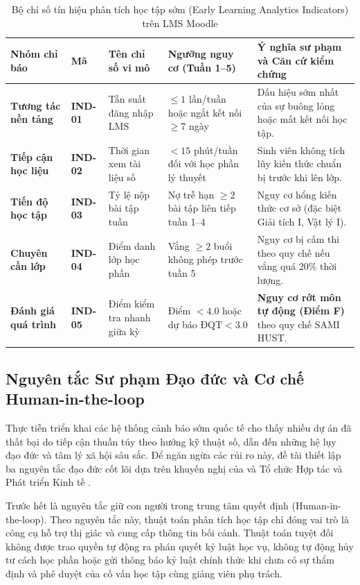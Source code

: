 \begin{table}[htbp]
\centering
\caption{Bộ chỉ số tín hiệu phân tích học tập sớm (Early Learning Analytics Indicators) trên LMS Moodle}
\label{tab:chi_so_la}
\vspace{0.2cm}
\begin{tabularx}{\textwidth}{|L{2.5cm}|C{1.5cm}|L{3.2cm}|C{2.0cm}|Y|}
\hline
\textbf{Nhóm chỉ báo} & \textbf{Mã} & \textbf{Tên chỉ số vi mô} & \textbf{Ngưỡng nguy cơ (Tuần 1--5)} & \textbf{Ý nghĩa sư phạm và Căn cứ kiểm chứng} \\
\hline
\textbf{Tương tác nền tảng} & \textbf{IND-01} & Tần suất đăng nhập LMS & $\le 1$ lần/tuần hoặc ngắt kết nối $\ge 7$ ngày & Dấu hiệu sớm nhất của sự buông lỏng hoặc mất kết nối học tập. \\
\hline
\textbf{Tiếp cận học liệu} & \textbf{IND-02} & Thời gian xem tài liệu số & $< 15$ phút/tuần đối với học phần lý thuyết & Sinh viên không tích lũy kiến thức chuẩn bị trước khi lên lớp. \\
\hline
\textbf{Tiến độ học tập} & \textbf{IND-03} & Tỷ lệ nộp bài tập tuần & Nợ trễ hạn $\ge 2$ bài tập liên tiếp tuần 1--4 & Nguy cơ hổng kiến thức cơ sở (đặc biệt Giải tích I, Vật lý I). \\
\hline
\textbf{Chuyên cần lớp} & \textbf{IND-04} & Điểm danh lớp học phần & Vắng $\ge 2$ buổi không phép trước tuần 5 & Nguy cơ bị cấm thi theo quy chế nếu vắng quá 20\% thời lượng. \\
\hline
\textbf{Đánh giá quá trình} & \textbf{IND-05} & Điểm kiểm tra nhanh giữa kỳ & Điểm $< 4.0$ hoặc dự báo $\text{ĐQT} < 3.0$ & \textbf{Nguy cơ rớt môn tự động (Điểm F)} theo quy chế SAMI HUST. \\
\hline
\end{tabularx}
\end{table}

\subsection{Nguyên tắc Sư phạm Đạo đức và Cơ chế Human-in-the-loop}
Thực tiễn triển khai các hệ thống cảnh báo sớm quốc tế cho thấy nhiều dự án đã thất bại do tiếp cận thuần túy theo hướng kỹ thuật số, dẫn đến những hệ lụy đạo đức và tâm lý xã hội sâu sắc. Để ngăn ngừa các rủi ro này, đề tài thiết lập ba nguyên tắc đạo đức cốt lõi dựa trên khuyến nghị của \citet{prinsloo2017} và Tổ chức Hợp tác và Phát triển Kinh tế \citep{oecd2023}.

Trước hết là nguyên tắc giữ con người trong trung tâm quyết định (Human-in-the-loop). Theo nguyên tắc này, thuật toán phân tích học tập chỉ đóng vai trò là công cụ hỗ trợ thị giác và cung cấp thông tin bối cảnh. Thuật toán tuyệt đối không được trao quyền tự động ra phán quyết kỷ luật học vụ, không tự động hủy tư cách học phần hoặc gửi thông báo kỷ luật chính thức khi chưa có sự thẩm định và phê duyệt của cố vấn học tập cùng giảng viên phụ trách.


